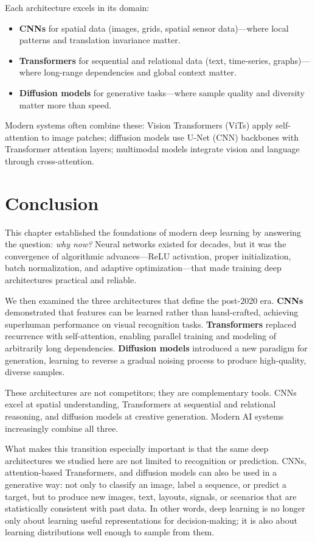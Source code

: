 \documentclass[12pt]{article}
\begin{document}
Each architecture excels in its domain:
\begin{itemize}
    \item \textbf{CNNs} for spatial data (images, grids, spatial sensor data)---where local patterns and translation invariance matter.
    \item \textbf{Transformers} for sequential and relational data (text, time-series, graphs)---where long-range dependencies and global context matter.
    \item \textbf{Diffusion models} for generative tasks---where sample quality and diversity matter more than speed.
\end{itemize}

Modern systems often combine these: Vision Transformers (ViTs) apply self-attention to image patches; diffusion models use U-Net (CNN) backbones with Transformer attention layers; multimodal models integrate vision and language through cross-attention.

\section{Conclusion}

This chapter established the foundations of modern deep learning by answering the question: \textit{why now?} Neural networks existed for decades, but it was the convergence of algorithmic advances---ReLU activation, proper initialization, batch normalization, and adaptive optimization---that made training deep architectures practical and reliable.

We then examined the three architectures that define the post-2020 era. \textbf{CNNs} demonstrated that features can be learned rather than hand-crafted, achieving superhuman performance on visual recognition tasks. \textbf{Transformers} replaced recurrence with self-attention, enabling parallel training and modeling of arbitrarily long dependencies. \textbf{Diffusion models} introduced a new paradigm for generation, learning to reverse a gradual noising process to produce high-quality, diverse samples.

These architectures are not competitors; they are complementary tools. CNNs excel at spatial understanding, Transformers at sequential and relational reasoning, and diffusion models at creative generation. Modern AI systems increasingly combine all three.

What makes this transition especially important is that the same deep architectures we studied here are not limited to recognition or prediction. CNNs, attention-based Transformers, and diffusion models can also be used in a generative way: not only to classify an image, label a sequence, or predict a target, but to produce new images, text, layouts, signals, or scenarios that are statistically consistent with past data. In other words, deep learning is no longer only about learning useful representations for decision-making; it is also about learning distributions well enough to sample from them.
\end{document}
